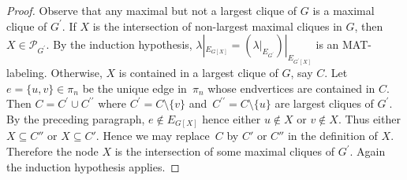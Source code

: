 \documentclass[ALCO, Unicode,published]{cedram}
\begin{document}
\begin{proof}
 


Observe that any maximal but not a largest clique of $ G $ is a maximal clique of $ G^{\prime} $. 
If $X$ is the intersection of non-largest maximal cliques in $G$, then $ X \in \mathcal{P}_{G^{\prime}} $.
By the induction hypothesis, $ \lambda|_{E_{G[X]}} = \left(\lambda|_{E_{G^{\prime}}}\right)|_{E_{G^{\prime}[X]}} $ is an MAT-labeling.
Otherwise, $X$ is contained in a largest clique of $G$, say $C$.
Let $e=\{u,v\} \in\pi_n$ be the unique edge in~$\pi_n$ whose endvertices are contained in $C$. 
 Then $ C = C^{\prime} \cup C^{\prime\prime}  $ where $ C^{\prime} = C \setminus  \{v\}$ and~$ C^{\prime\prime} = C \setminus  \{u\} $ are largest cliques of $ G^{\prime} $. 
 By the preceding paragraph, $e \notin E_{G[X]}$ hence either $u \notin X$ or $v \notin X$. 
 Thus either $X \subseteq C''$ or $X \subseteq C'$.
Hence we may replace~$C$ by $C'$ or $C''$ in the definition of $X$.
Therefore the node $ X $ is the intersection of some maximal cliques of $ G^{\prime} $. 
Again the  induction hypothesis applies. 
\end{proof}
\end{document}
